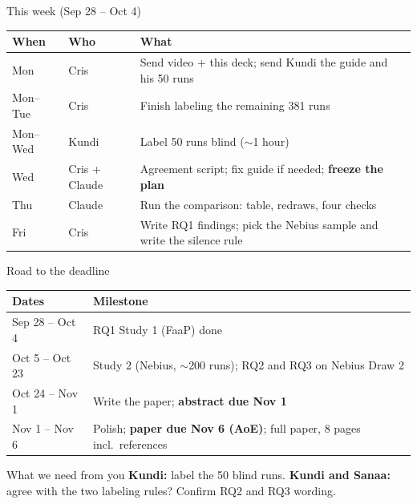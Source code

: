 \documentclass[aspectratio=169,11pt]{beamer}
\begin{document}
\begin{frame}{This week (Sep 28 -- Oct 4)}
  \small
  \begin{tabularx}{\textwidth}{@{}llL@{}}
    \toprule
    \textbf{When} & \textbf{Who} & \textbf{What} \\
    \midrule
    Mon & Cris & Send video + this deck; send Kundi the guide and his 50 runs \\
    Mon--Tue & Cris & Finish labeling the remaining 381 runs \\
    Mon--Wed & Kundi & Label 50 runs blind ($\sim$1 hour) \\
    Wed & Cris + Claude & Agreement script; fix guide if needed; \textbf{freeze the plan} \\
    Thu & Claude & Run the comparison: table, redraws, four checks \\
    Fri & Cris & Write RQ1 findings; pick the Nebius sample and write the silence rule \\
    \bottomrule
  \end{tabularx}
\end{frame}

\begin{frame}{Road to the deadline}
  \small
  \begin{tabularx}{\textwidth}{@{}lL@{}}
    \toprule
    \textbf{Dates} & \textbf{Milestone} \\
    \midrule
    Sep 28 -- Oct 4 & RQ1 Study 1 (FaaP) done \\
    Oct 5 -- Oct 23 & Study 2 (Nebius, $\sim$200 runs); RQ2 and RQ3 on Nebius Draw 2 \\
    Oct 24 -- Nov 1 & Write the paper; \textbf{abstract due Nov 1} \\
    Nov 1 -- Nov 6 & Polish; \textbf{paper due Nov 6 (AoE)}; full paper, 8 pages incl.\ references \\
    \bottomrule
  \end{tabularx}
  \vspace{6pt}
  \begin{block}{What we need from you}\small
    \textbf{Kundi:} label the 50 blind runs.
    \textbf{Kundi and Sanaa:} agree with the two labeling rules? Confirm RQ2 and RQ3 wording.
  \end{block}
\end{frame}
\end{document}
